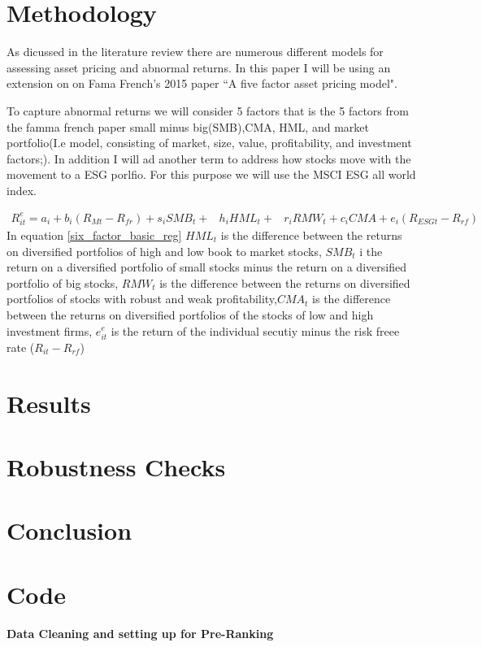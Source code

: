 \documentclass[12pt,oneside,reqno]{amsart}
\begin{document}
\section{Methodology}
\label{Methodology}
As dicussed in the literature review there are numerous different models for assessing asset pricing and abnormal returns. In this paper I will be using an extension on on Fama French's 2015 paper ``A five factor asset pricing model".

To capture abnormal returns we will consider 5 factors that is the 5 factors from the famma french paper small minus big(SMB),CMA, HML, and market portfolio(I.e model, consisting of market, size, value, profitability, and investment factors;). In addition I will ad another term to address how stocks move with the movement to a ESG porlfio. For this purpose we will use the MSCI ESG all world index. 

\begin{equation}
\begin{split}
    R_{it}^e = a_i+b_i(R_{Mt}-R_{fr})+s_iSMB_t+ & h_iHML_t+ & r_iRMW_t+c_iCMA+e_i(R_{ESG t}-R_{rf})
    \end{split}
    \label{six_factor_basic_reg}
\end{equation}
In equation \eqref{six_factor_basic_reg} $HML_{t}$ is the difference between the returns on diversified portfolios of high and low book to market stocks, $SMB_{t}$ i the return on a diversified portfolio of small stocks minus the return on a diversified portfolio of big stocks, $RMW_t$ is the difference between the returns on diversified portfolios of stocks with robust and weak profitability,$CMA_{t}$ is the difference between the returns on diversified portfolios of the stocks of low and high investment firms, $e^e_{it}$ is the return of the individual secutiy minus the risk freee rate ($R_{it}-R_{rf}$)


\section{Results}
\label{Results}

\section{Robustness Checks}
\label{Robustness}

\section{Conclusion}
\label{Conclusion}
\section{Code}
\textbf{Data Cleaning and setting up for Pre-Ranking}



\end{document}
